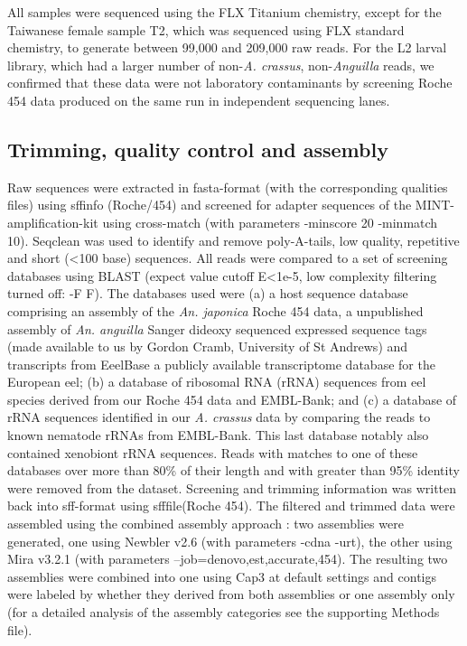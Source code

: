 \documentclass[10pt]{bmc_article}
\newenvironment{bmcformat}{\begin{raggedright}\baselineskip20pt\sloppy\setboolean{publ}{false}}{\end{raggedright}\baselineskip20pt\sloppy}
\begin{document}
\begin{bmcformat}
All samples were sequenced using the FLX Titanium chemistry, except
for the Taiwanese female sample T2, which was sequenced using FLX
standard chemistry, to generate between 99,000 and 209,000 raw
reads. For the L2 larval library, which had a larger number of
non-\textit{A. crassus}, non-\textit{Anguilla} reads, we confirmed
that these data were not laboratory contaminants by screening Roche
454 data produced on the same run in independent sequencing lanes.

\subsection*{Trimming, quality control and assembly}

Raw sequences were extracted in fasta-format (with the corresponding
qualities files) using sffinfo (Roche/454) and screened for adapter
sequences of the MINT-amplification-kit using cross-match \cite{PHRAP}
(with parameters -minscore 20 -minmatch 10). Seqclean
\cite{tgicl_pertea} was used to identify and remove poly-A-tails, low
quality, repetitive and short (<100 base) sequences. All reads were
compared to a set of screening databases using BLAST (expect value
cutoff E<1e-5, low complexity filtering turned off: -F F). The
databases used were (a) a host sequence database comprising an
assembly of the \textit{An. japonica} Roche 454 data, a unpublished
assembly of \textit{An. anguilla} Sanger dideoxy sequenced expressed
sequence tags (made available to us by Gordon Cramb, University of St
Andrews) and transcripts from EeelBase \cite{pmid21080939} a publicly
available transcriptome database for the European eel; (b) a database
of ribosomal RNA (rRNA) sequences from eel species derived from our
Roche 454 data and EMBL-Bank; and (c) a database of rRNA sequences
identified in our \textit{A. crassus} data by comparing the reads to
known nematode rRNAs from EMBL-Bank. This last database notably also
contained xenobiont rRNA sequences. Reads with matches to one of these
databases over more than 80\% of their length and with greater than
95\% identity were removed from the dataset. Screening and trimming
information was written back into sff-format using sfffile(Roche
454). The filtered and trimmed data were assembled using the combined
assembly approach \cite{pmid20950480}: two assemblies were generated,
one using Newbler v2.6 \cite{pmid16056220} (with parameters -cdna
-urt), the other using Mira v3.2.1 \cite{miraEST} (with parameters
--job=denovo,est,accurate,454). The resulting two assemblies were
combined into one using Cap3 \cite{Cap3_Huang} at default settings and
contigs were labeled by whether they derived from both assemblies or
one assembly only (for a detailed analysis of the assembly categories
see the supporting Methods file).


\end{bmcformat}
\end{document}
